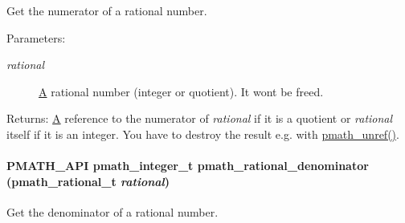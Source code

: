 Get the numerator of a rational number. 

\begin{Desc}
\item[Parameters:]
\begin{description}
\item[{\em rational}]\hyperlink{class_a}{A} rational number (integer or quotient). It wont be freed. \end{description}
\end{Desc}
\begin{Desc}
\item[Returns:]\hyperlink{class_a}{A} reference to the numerator of {\em rational\/} if it is a quotient or {\em rational\/} itself if it is an integer. You have to destroy the result e.g. with \hyperlink{classpmath__t_54e905402c38940687033b87eb8c6c9f}{pmath\_\-unref()}. \end{Desc}
\hypertarget{group__numbers_ga3f1718d2252ebce77bed83df7223f4c}{
\paragraph[{pmath\_\-rational\_\-denominator}]{\setlength{\rightskip}{0pt plus 5cm}PMATH\_\-API {\bf pmath\_\-integer\_\-t} pmath\_\-rational\_\-denominator ({\bf pmath\_\-rational\_\-t} {\em rational})}\hfill}
\label{group__numbers_ga3f1718d2252ebce77bed83df7223f4c}


Get the denominator of a rational number. 

